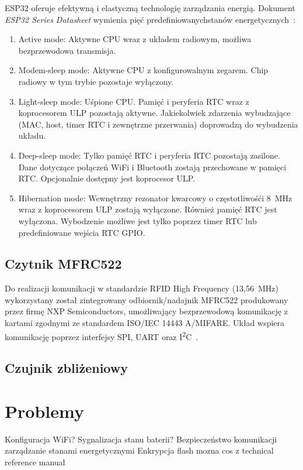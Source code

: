             ESP32 oferuje efektywną i elastyczną technologię zarządzania energią. Dokument \textit{ESP32 Series Datasheet} wymienia pięć predefiniowanychstanów energetycznych~\cite{esp32-ds}:
            \begin{enumerate}
                \item Active mode: Aktywne CPU wraz z układem radiowym, możliwa bezprzewodowa transmisja.
                \item Modem-sleep mode: Aktywne CPU z konfigurowalnym zegarem. Chip radiowy w tym trybie pozostaje wyłączony.
                \item Light-sleep mode: Uśpione CPU. Pamięć i peryferia RTC wraz z koprocesorem ULP pozostają aktywne. Jakiekolwiek zdarzenia wybudzające (MAC, host, timer RTC i zewnętrzne przerwania) doprowadzą do wybudzenia układu.
                \item Deep-sleep mode: Tylko pamięć RTC i peryferia RTC pozostają zasilone. Dane dotyczące połączeń WiFi i Bluetooth zostają przechowane w pamięci RTC. Opcjonalnie dostępny jest koprocesor ULP.
                \item Hibernation mode: Wewnętrzny rezonator kwarcowy o częstotliwośći 8~MHz wraz z koprocesorem ULP zostają wyłączone. Również pamięć RTC jest wyłączona. Wybodzenie możliwe jest tylko poprzez timer RTC lub predefiniowane wejścia RTC GPIO.
            \end{enumerate}

        \subsection{Czytnik MFRC522}

            Do realizacji komunikacji w standardzie RFID High Frequency (13,56~MHz) wykorzystany został zintegrowany odbiornik/nadajnik MFRC522 produkowany przez firmę NXP Semiconductors, umożliwający bezprzewodową komunikację z kartami zgodnymi ze standardem ISO/IEC 14443 A/MIFARE. Układ wspiera komunikację poprzez interfejsy SPI, UART oraz I\textsuperscript{2}C~\cite{mfrc522-ds}.

        \subsection{Czujnik zbliżeniowy}


    \section{Problemy}
        Konfiguracja WiFi?
        Sygnalizacja stanu baterii?
        Bezpieczeństwo komunikacji
        zarządzanie stanami energetycznymi
        Enkrypcja flash
        mozna cos z technical reference manual


